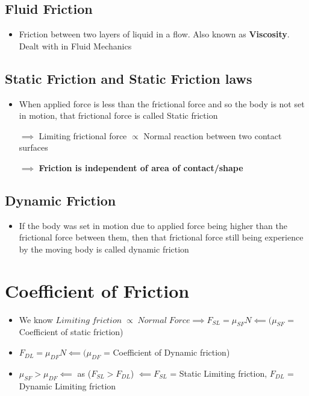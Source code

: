 \documentclass[8pt]{report}
\begin{document}
\subsection{Fluid Friction}
	\begin{itemize}
		\item Friction between two layers of liquid in a flow. Also known as \textbf{Viscosity}. Dealt with in Fluid Mechanics
	\end{itemize}
\subsection{Static Friction and Static Friction laws}
	\begin{itemize}
		\item When applied force is less than the frictional force and so the body is not set in motion, that frictional force is called Static friction
		\item[$\implies$] Limiting frictional force $\propto$ Normal reaction between two contact surfaces
		\item[$\implies$] \textbf{Friction is independent of area of contact/shape}
	\end{itemize}
\subsection{Dynamic Friction}
	\begin{itemize}
		\item If the body was set in motion due to applied force being higher than the frictional force between them, then that frictional force still being experience by the moving body is called dynamic friction
	\end{itemize}
\section{Coefficient of Friction}
	\begin{itemize}
		\item We know $Limiting\;friction\;\propto\;Normal\;Force \implies \boxed{F_{SL} = \mu_{SF} N}\impliedby (\mu_{SF}$ = Coefficient of static friction)
		\item $\boxed{F_{DL}=\mu_{DF}N}\impliedby(\mu_{DF}$ = Coefficient of Dynamic friction)
		\item $\boxed{\mu_{SF}>\mu_{DF}}\impliedby$ as ($F_{SL}>F_{DL}$) $\impliedby F_{SL}$ = Static Limiting friction, $F_{DL}$ = Dynamic Limiting friction
	\end{itemize}\hrulefill
\end{document}
